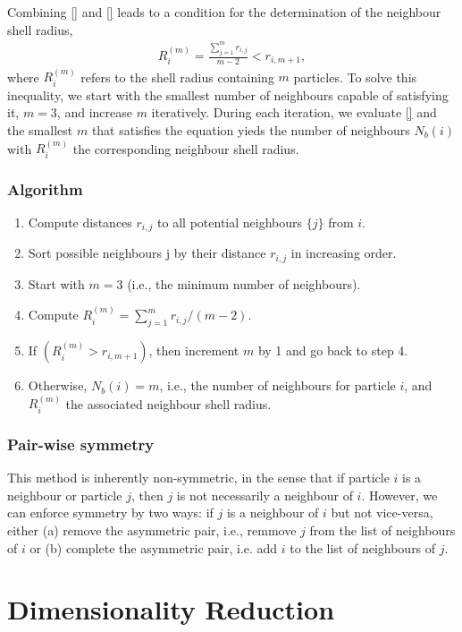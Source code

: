\documentclass{report}
\begin{document}
Combining \eqref{} and \eqref{} leads to a condition for the determination of the neighbour shell radius,
\begin{align}
	R_i^{(m)}=\frac{\sum_{j=1}^m r_{i,j}}{m-2}<r_{i,m+1},
\end{align}
where $R_i^{(m)}$ refers to the shell radius containing $m$ particles. To solve this inequality, we start with the smallest number of neighbours capable of satisfying it, $m=3$, and increase $m$ iteratively. During each iteration, we evaluate \eqref{} and the smallest $m$ that satisfies the equation yieds the number of neighbours $N_b(i)$ with $R_i^{(m)}$ the corresponding neighbour shell radius. 

\subsection{Algorithm}

\begin{enumerate}
	\item Compute distances $r_{i,j}$ to all potential neighbours $\{j\}$ from $i$.
	\item Sort possible neighbours {j} by their distance $r_{i,j}$ in increasing order.
	\item Start with $m=3$ (i.e., the minimum number of neighbours).
	\item Compute $R_i^{(m)}=\sum_{j=1}^mr_{i,j}/(m-2)$.
	\item If $(R_i^{(m)}>r_{i,m+1})$, then increment $m$ by 1 and go back to step 4.
	\item Otherwise, $N_b(i)=m$, i.e., the number of neighbours for particle $i$, and $R_i^{(m)}$ the associated neighbour shell radius.
\end{enumerate}

\subsection{Pair-wise symmetry}

This method is inherently non-symmetric, in the sense that if particle $i$ is a neighbour or particle $j$, then $j$ is not necessarily a neighbour of $i$. However, we can enforce symmetry by two ways: if $j$ is a neighbour of $i$ but not vice-versa, either (a) remove the asymmetric pair, i.e., remmove $j$ from the list of neighbours of $i$ or (b) complete the asymmetric pair, i.e. add $i$ to the list of neighbours of $j$.




\chapter{Dimensionality Reduction}
\end{document}
